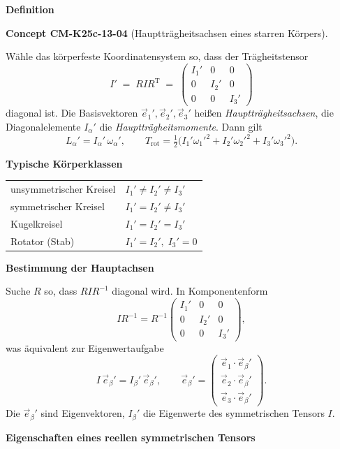 \documentclass[10pt, letterpaper]{article}
\newcommand{\CustomHeading}[3]{%
  \par\medskip\noindent%
  \textbf{#1 #2} \textnormal{(#3)}.\enskip%
}
\newenvironment{CONC}[2]{\begin{unitbox}\CustomHeading{Concept}{#1}{#2}}{\end{unitbox}}
\begin{document}
\textbf{Definition}

\begin{CONC}{CM-K25c-13-04}{Hauptträgheitsachsen eines starren Körpers}
Wähle das körperfeste Koordinatensystem so, dass der Trägheits­tensor
\[
  I' \;=\; R I R^{\mathrm T}
  \;=\;
  \begin{pmatrix}
    I_1' & 0 & 0 \\
    0 & I_2' & 0 \\
    0 & 0 & I_3'
  \end{pmatrix}
\]
diagonal ist.  
Die Basisvektoren $\vec e_1',\vec e_2',\vec e_3'$ heißen
\emph{Hauptträgheitsachsen},
die Diagonalelemente $I_\alpha'$ die
\emph{Hauptträgheitsmomente}.
Dann gilt
\[
  L_\alpha' = I_\alpha'\,\omega_\alpha',
  \qquad
  T_{\text{rot}}=\tfrac12
    \bigl(I_1'\omega_1'^{2}+I_2'\omega_2'^{2}+I_3'\omega_3'^{2}\bigr).
\]

\textbf{Typische Körperklassen}

\begin{tabular}{@{}ll@{}}
unsymmetrischer Kreisel & $I_1'\neq I_2'\neq I_3'$ \\[2pt]
symmetrischer Kreisel  & $I_1'=I_2'\neq I_3'$ \\[2pt]
Kugelkreisel           & $I_1'=I_2'=I_3'$ \\[2pt]
Rotator (Stab)         & $I_1'=I_2',\;I_3'=0$
\end{tabular}



\textbf{Bestimmung der Hauptachsen}

Suche $R$ so, dass $RIR^{-1}$ diagonal wird.
In Komponentenform
\[
  I R^{-1} = R^{-1}
  \begin{pmatrix}
    I_1' & 0 & 0 \\ 0 & I_2' & 0 \\ 0 & 0 & I_3'
  \end{pmatrix},
\]
was äquivalent zur Eigenwertaufgabe
\[
  I\,\vec e_\beta' = I_\beta'\,\vec e_\beta',
  \qquad
  \vec e_\beta' =
  \begin{pmatrix}
    \vec e_1\!\cdot\!\vec e_\beta'\\
    \vec e_2\!\cdot\!\vec e_\beta'\\
    \vec e_3\!\cdot\!\vec e_\beta'
  \end{pmatrix}.
\]
Die $\vec e_\beta'$ sind Eigen­vektoren, $I_\beta'$ die
Eigen­werte des symmetrischen Tensors $I$.
\end{CONC}

\textbf{Eigenschaften eines reellen symmetrischen Tensors}
\end{document}
